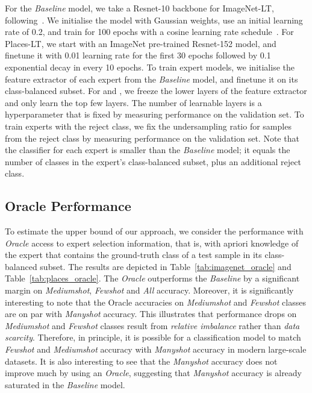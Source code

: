 \documentclass[runningheads]{llncs}
\newcommand{\myparagraph}[1]{\noindent{\bf #1}}
\begin{document}
\myparagraph{Implementation Details.}
 For the \emph{Baseline} model, we take a Resnet-10 backbone for ImageNet-LT, following~\cite{liu2019large}. We initialise the model with Gaussian weights, use an initial learning rate of 0.2, and train for 100 epochs with a cosine learning rate schedule~\cite{loshchilov2016sgdr}. For Places-LT, we start with an ImageNet pre-trained Resnet-152 model, and finetune it with 0.01 learning rate for the first 30 epochs followed by 0.1 exponential decay in every 10 epochs. To train expert models, we initialise the feature extractor of each expert  from the \emph{Baseline} model, and finetune it on its class-balanced subset. For  and , we freeze the lower layers of the feature extractor and only learn the top few layers. The number of learnable layers is a hyperparameter that is fixed by measuring performance on the validation set. To train experts with the reject class, we fix the undersampling ratio for samples from the reject class by measuring performance on the validation set. Note that the classifier for each expert  is smaller than the \emph{Baseline} model; it equals the number of classes in the expert's class-balanced subset, plus an additional reject class. 

\subsection{Oracle Performance}
To estimate the upper bound of our approach, we consider the performance with \emph{Oracle} access to expert selection information, that is, with apriori knowledge of the expert  that contains the ground-truth class of a test sample in its class-balanced subset. The results are depicted in Table~\ref{tab:imagenet_oracle} and Table~\ref{tab:places_oracle}. The \emph{Oracle} outperforms the \emph{Baseline} by a significant margin on \emph{Mediumshot}, \emph{Fewshot} and \emph{All} accuracy. Moreover, it is significantly interesting to note that the Oracle accuracies on \emph{Mediumshot} and \emph{Fewshot} classes are on par with \emph{Manyshot} accuracy. This illustrates that performance drops on \emph{Mediumshot} and \emph{Fewshot} classes result from \emph{relative imbalance} rather than \emph{data scarcity}. Therefore, in principle, it is possible for a classification model to match \emph{Fewshot} and \emph{Mediumshot} accuracy with \emph{Manyshot} accuracy in modern large-scale datasets. It is also interesting to see that the \emph{Manyshot} accuracy does not improve much by using an \emph{Oracle}, suggesting that \emph{Manyshot} accuracy is already saturated in the \emph{Baseline} model.
\end{document}
